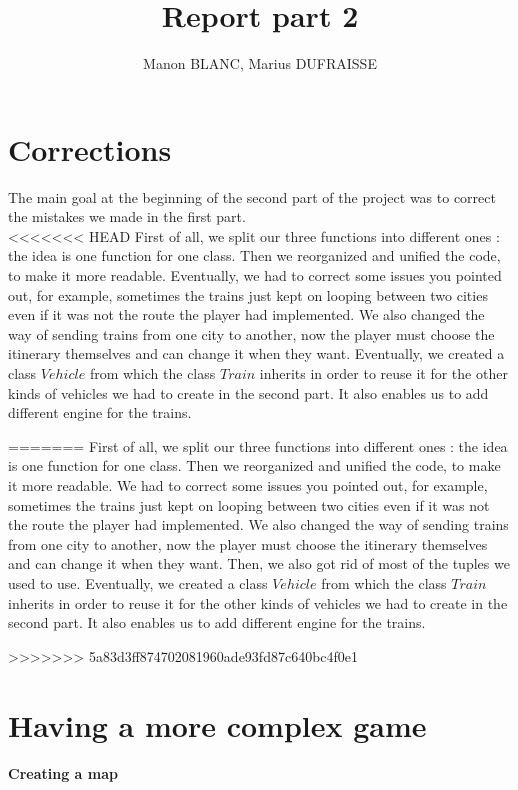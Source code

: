 \documentclass[a4paper]{article}
\title{Report part 2}
\author{Manon BLANC, Marius DUFRAISSE}
\date{  }
\begin{document}
	\maketitle
	\thispagestyle{fancy}

	\section{Corrections}
	The main goal at the beginning of the second part of the project was to correct the mistakes we made in the first part.\\
<<<<<<< HEAD
	First of all, we split our three functions into different ones : the idea is one function for one class. Then we reorganized and unified the code, to make it more readable. Eventually, we had to correct some issues you pointed out, for example, sometimes the trains just kept on looping between two cities even if it was not the route the player had implemented. We also changed the way of sending trains from one city to another, now the player must choose the itinerary themselves and can change it when they want. Eventually, we created a class $Vehicle$ from which the class $Train$ inherits in order to reuse it for the other kinds of vehicles we had to create in the second part. It also enables us to add different engine for the trains.

=======
	First of all, we split our three functions into different ones : the idea is one function for one class. Then we reorganized and unified the code, to make it more readable. We had to correct some issues you pointed out, for example, sometimes the trains just kept on looping between two cities even if it was not the route the player had implemented. We also changed the way of sending trains from one city to another, now the player must choose the itinerary themselves and can change it when they want. Then, we also got rid of most of the tuples we used to use. Eventually, we created a class $Vehicle$ from which the class $Train$ inherits in order to reuse it for the other kinds of vehicles we had to create in the second part. It also enables us to add different engine for the trains.
	
>>>>>>> 5a83d3ff874702081960ade93fd87c640bc4f0e1
	\section{Having a more complex game}
	\paragraph{Creating a map}
\end{document}
